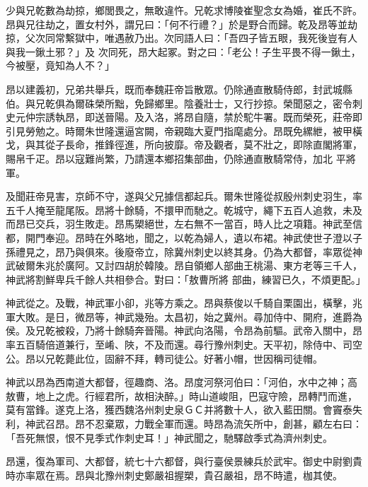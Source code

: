 \begin{pinyinscope}
 少與兄乾數為劫掠，鄉閭畏之，無敢違忤。兄乾求博陵崔聖念女為婚，崔氏不許。昂與兄往劫之，置女村外，謂兄曰：「何不行禮？」於是野合而歸。乾及昂等並劫掠，父次同常繫獄中，唯遇赦乃出。次同語人曰：「吾四子皆五眼，我死後豈有人與我一鍬土邪？」及
 次同死，昂大起冢。對之曰：「老公！子生平畏不得一鍬土，今被壓，竟知為人不？」



 昂以建義初，兄弟共舉兵，既而奉魏莊帝旨散眾。仍除通直散騎侍郎，封武城縣伯。與兄乾俱為爾硃榮所黜，免歸鄉里。陰養壯士，又行抄掠。榮聞惡之，密令刺史元仲宗誘執昂，即送晉陽。及入洛，將昂自隨，禁於駝牛署。既而榮死，莊帝即引見勞勉之。時爾朱世隆還逼宮闕，帝親臨大夏門指麾處分。昂既免縲紲，被甲橫戈，與其從子長命，推鋒徑進，所向披靡。帝及觀者，莫不壯之，即除直閣將軍，賜帛千疋。昂以寇難尚繁，乃請還本鄉招集部曲，仍除通直散騎常侍，加北
 平將軍。



 及聞莊帝見害，京師不守，遂與父兄據信都起兵。爾朱世隆從叔殷州刺史羽生，率五千人掩至龍尾阪。昂將十餘騎，不擐甲而馳之。乾城守，繩下五百人追救，未及而昂已交兵，羽生敗走。昂馬槊絕世，左右無不一當百，時人比之項籍。神武至信都，開門奉迎。昂時在外略地，聞之，以乾為婦人，遺以布裙。神武使世子澄以子孫禮見之，昂乃與俱來。後廢帝立，除冀州刺史以終其身。仍為大都督，率眾從神武破爾朱兆於廣阿。又討四胡於韓陵。昂自領鄉人部曲王桃湯、東方老等三千人，神武將割鮮卑兵千餘人共相參合。對曰：「敖曹所將
 部曲，練習已久，不煩更配。」



 神武從之。及戰，神武軍小卻，兆等方乘之。昂與蔡俊以千騎自栗園出，橫擊，兆軍大敗。是日，微昂等，神武幾殆。太昌初，始之冀州。尋加侍中、開府，進爵為侯。及兄乾被殺，乃將十餘騎奔晉陽。神武向洛陽，令昂為前驅。武帝入關中，昂率五百騎倍道兼行，至崤、陜，不及而還。尋行豫州刺史。天平初，除侍中、司空公。昂以兄乾薨此位，固辭不拜，轉司徒公。好著小帽，世因稱司徒帽。



 神武以昂為西南道大都督，徑趣商、洛。昂度河祭河伯曰：「河伯，水中之神；高敖曹，地上之虎。行經君所，故相決醉。」時山道峻阻，巴寇守險，昂轉鬥而進，
 莫有當鋒。遂克上洛，獲西魏洛州刺史泉ＧＣ并將數十人，欲入藍田關。會竇泰失利，神武召昂。昂不忍棄眾，力戰全軍而還。時昂為流矢所中，創甚，顧左右曰：「吾死無恨，恨不見季式作刺史耳！」神武聞之，馳驛啟季式為濟州刺史。



 昂還，復為軍司、大都督，統七十六都督，與行臺侯景練兵於武牢。御史中尉劉貴時亦率眾在焉。昂與北豫州刺史鄭嚴祖握槊，貴召嚴祖，昂不時遣，枷其使。




\end{pinyinscope}
